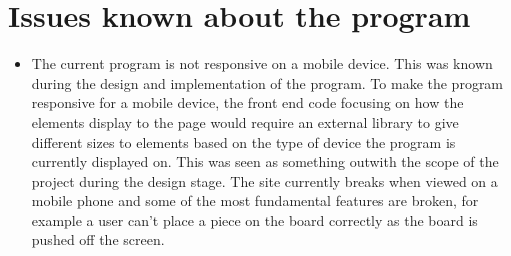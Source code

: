 \documentclass{l4proj}
\begin{document}
\section{Issues known about the program}
\label{section:issues}
\begin{itemize}
    \item The current program is not responsive on a mobile device. This was known during the design and implementation of the program. To make the program responsive for a mobile device, the front end code focusing on how the elements display to the page would require an external library to give different sizes to elements based on the type of device the program is currently displayed on. This was seen as something outwith the scope of the project during the design stage. The site currently breaks when viewed on a mobile phone and some of the most fundamental features are broken, for example a user can't place a piece on the board correctly as the board is pushed off the screen.


\end{itemize}
\end{document}
